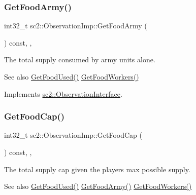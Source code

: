 \subsubsection{\texorpdfstring{Get\+Food\+Army()}{GetFoodArmy()}}
{\footnotesize\ttfamily int32\+\_\+t sc2\+::\+Observation\+Imp\+::\+Get\+Food\+Army (\begin{DoxyParamCaption}{ }\end{DoxyParamCaption}) const\hspace{0.3cm}{\ttfamily [inline]}, {\ttfamily [final]}, {\ttfamily [virtual]}}

The total supply consumed by army units alone. \begin{DoxySeeAlso}{See also}
\hyperlink{classsc2_1_1_observation_imp_a5489d7a3c6095b29c82e835bb3eb2aba}{Get\+Food\+Used()} \hyperlink{classsc2_1_1_observation_imp_a88f76eedeac5d81f608b68ca3ff69782}{Get\+Food\+Workers()} 
\end{DoxySeeAlso}


Implements \hyperlink{classsc2_1_1_observation_interface_a7fd13a2a776f08f714d941ba9e4bafa8}{sc2\+::\+Observation\+Interface}.

\mbox{\label{classsc2_1_1_observation_imp_a5e109c30ac039c19bf0c7d3b35bd7ab7}} 
\subsubsection{\texorpdfstring{Get\+Food\+Cap()}{GetFoodCap()}}
{\footnotesize\ttfamily int32\+\_\+t sc2\+::\+Observation\+Imp\+::\+Get\+Food\+Cap (\begin{DoxyParamCaption}{ }\end{DoxyParamCaption}) const\hspace{0.3cm}{\ttfamily [inline]}, {\ttfamily [final]}, {\ttfamily [virtual]}}

The total supply cap given the players max possible supply. \begin{DoxySeeAlso}{See also}
\hyperlink{classsc2_1_1_observation_imp_a5489d7a3c6095b29c82e835bb3eb2aba}{Get\+Food\+Used()} \hyperlink{classsc2_1_1_observation_imp_a97f6013fc1578cc1db1266d39edab7c4}{Get\+Food\+Army()} \hyperlink{classsc2_1_1_observation_imp_a88f76eedeac5d81f608b68ca3ff69782}{Get\+Food\+Workers()} 
\end{DoxySeeAlso}


